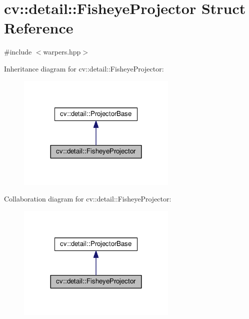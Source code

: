 \hypertarget{structcv_1_1detail_1_1FisheyeProjector}{\section{cv\-:\-:detail\-:\-:Fisheye\-Projector Struct Reference}
\label{structcv_1_1detail_1_1FisheyeProjector}
}


{\ttfamily \#include $<$warpers.\-hpp$>$}



Inheritance diagram for cv\-:\-:detail\-:\-:Fisheye\-Projector\-:\nopagebreak
\begin{figure}[H]
\begin{center}
\leavevmode
\includegraphics[width=216pt]{structcv_1_1detail_1_1FisheyeProjector__inherit__graph}
\end{center}
\end{figure}


Collaboration diagram for cv\-:\-:detail\-:\-:Fisheye\-Projector\-:\nopagebreak
\begin{figure}[H]
\begin{center}
\leavevmode
\includegraphics[width=216pt]{structcv_1_1detail_1_1FisheyeProjector__coll__graph}
\end{center}
\end{figure}
